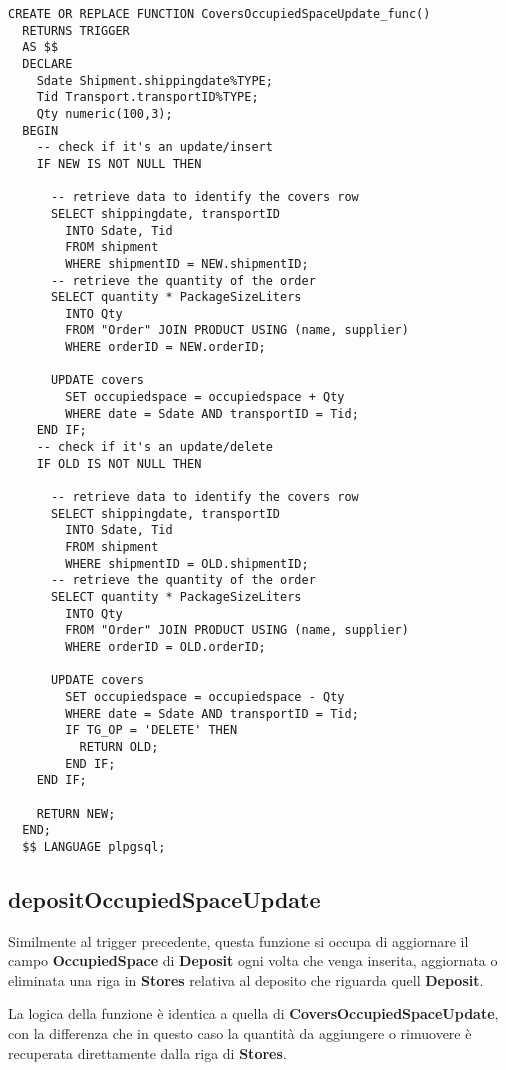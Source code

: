 \newpage

\begin{lstlisting}[caption={Funzione \textbf{CoversOccupiedSpaceUpdate}}]
  CREATE OR REPLACE FUNCTION CoversOccupiedSpaceUpdate_func()
  RETURNS TRIGGER
  AS $$
  DECLARE
    Sdate Shipment.shippingdate%TYPE;
    Tid Transport.transportID%TYPE;
    Qty numeric(100,3);
  BEGIN
    -- check if it's an update/insert
    IF NEW IS NOT NULL THEN

      -- retrieve data to identify the covers row
      SELECT shippingdate, transportID
        INTO Sdate, Tid
        FROM shipment
        WHERE shipmentID = NEW.shipmentID;
      -- retrieve the quantity of the order
      SELECT quantity * PackageSizeLiters
        INTO Qty
        FROM "Order" JOIN PRODUCT USING (name, supplier)
        WHERE orderID = NEW.orderID;

      UPDATE covers
        SET occupiedspace = occupiedspace + Qty
        WHERE date = Sdate AND transportID = Tid;
    END IF;
    -- check if it's an update/delete
    IF OLD IS NOT NULL THEN

      -- retrieve data to identify the covers row
      SELECT shippingdate, transportID
        INTO Sdate, Tid
        FROM shipment
        WHERE shipmentID = OLD.shipmentID;
      -- retrieve the quantity of the order
      SELECT quantity * PackageSizeLiters
        INTO Qty
        FROM "Order" JOIN PRODUCT USING (name, supplier)
        WHERE orderID = OLD.orderID;

      UPDATE covers
        SET occupiedspace = occupiedspace - Qty
        WHERE date = Sdate AND transportID = Tid;
        IF TG_OP = 'DELETE' THEN
          RETURN OLD;
        END IF;
    END IF;

    RETURN NEW;
  END;
  $$ LANGUAGE plpgsql;
\end{lstlisting}

\subsection{\textbf{depositOccupiedSpaceUpdate}}

Similmente al trigger precedente, questa funzione si occupa di aggiornare il campo \textbf{OccupiedSpace} di \textbf{Deposit} ogni volta che venga inserita, aggiornata o eliminata una riga in \textbf{Stores} relativa al deposito che riguarda quell \textbf{Deposit}.

La logica della funzione è identica a quella di \textbf{CoversOccupiedSpaceUpdate}, con la differenza che in questo caso la quantità da aggiungere o rimuovere è recuperata direttamente dalla riga di \textbf{Stores}.

